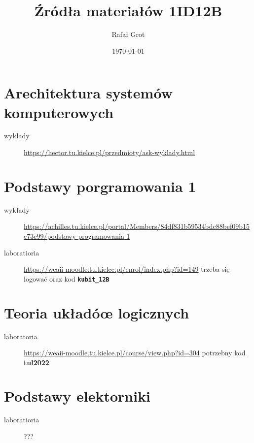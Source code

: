 \documentclass[11pt]{article}
\author{Rafał Grot}
\date{\today}
\title{Źródła materiałów 1ID12B}
\begin{document}
\maketitle
\tableofcontents


\section{Arechitektura systemów komputerowych}
\label{sec:org96b8ad4}
\begin{description}
\item[{wykłady}] \url{https://hector.tu.kielce.pl/przedmioty/ask-wyklady.html}
\end{description}
\section{Podstawy porgramowania 1}
\label{sec:orgb11f382}
\begin{description}
\item[{wykłady}] \url{https://achilles.tu.kielce.pl/portal/Members/84df831b59534bdc88bef09b15e73c99/podstawy-programowania-1}
\item[{laboratioria}] \url{https://weaii-moodle.tu.kielce.pl/enrol/index.php?id=149} trzeba się logować oraz kod \textbf{\texttt{kubit\_12B}}
\end{description}
\section{Teoria układóœ logicznych}
\label{sec:orgefc0a80}
\begin{description}
\item[{laboratoria}] \url{https://weaii-moodle.tu.kielce.pl/course/view.php?id=304} potrzebny kod \textbf{tul2022}
\end{description}
\section{Podstawy elektorniki}
\label{sec:org920846f}
\begin{description}
\item[{laboratioria}] ???
\end{description}
\end{document}
